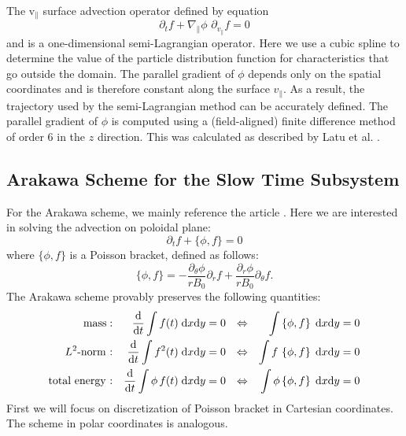 The v$_\parallel$ surface advection operator defined by equation
\begin{equation}
    \partial_t f + \nabla_\parallel \phi\,\, \partial_{v_{\parallel}} f = 0
\end{equation}
and is a one-dimensional semi-Lagrangian operator. Here we use a cubic spline to determine the value of the particle distribution function for characteristics that go outside the domain. The parallel gradient of $\phi$ depends only on the spatial coordinates and is therefore constant along the surface $v_\parallel$. As a result, the trajectory used by the semi-Lagrangian method can be accurately defined. The parallel gradient of $\phi$ is computed using a (field-aligned) finite difference method of order 6 in the $z$ direction. This was calculated as described by Latu et al. \cite{Latu_2017}.





\subsection{Arakawa Scheme for the Slow Time Subsystem}

For the Arakawa scheme, we mainly reference the article \cite{Arakawa_1966}. Here we are interested in solving the advection on poloidal plane:
\begin{equation}
 \partial_t f + \{\phi, f\} = 0
\end{equation}
where $\{\phi,f\}$ is a Poisson bracket, defined as follows:
\begin{equation}
 \{\phi,f\}=-\frac{\partial_\theta\phi}{rB_0}\partial_r f + \frac{\partial_r\phi}{rB_0}\partial_\theta f.
\end{equation}
The Arakawa scheme provably preserves the following quantities: %
	\begin{align*}
		\text{mass} : && \frac{\text{d}}{\text{d} t} \int f(t) \;\text{d} x \text{d} y & = 0 & \Leftrightarrow && \int\left\{ \phi, f \right\} \;\text{d} x \text{d} y & = 0 \\
		L^2\text{-norm :} && \frac{\text{d}}{\text{d} t} \int f^2(t) \;\text{d} x \text{d} y & = 0 & \Leftrightarrow && \int f \, \left\{ \phi, f \right\} \;\text{d} x \text{d} y & = 0 \\
		\text{total energy :} && \frac{\text{d}}{\text{d} t} \int \phi \, f(t) \;\text{d} x \text{d} y & = 0 & \Leftrightarrow && \int \phi \left\{ \phi, f \right\} \;\text{d} x \text{d} y & = 0
	\end{align*}
First we will focus on discretization of Poisson bracket in Cartesian coordinates. The scheme in polar coordinates is analogous.





